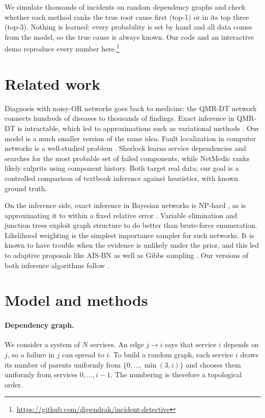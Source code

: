 \documentclass{article}
\begin{document}
We simulate thousands of incidents on random dependency graphs and check
whether each method ranks the true root cause first (top-1) or in its top
three (top-3). Nothing is learned: every probability is set by hand and all
data comes from the model, so the true cause is always known. Our code and an
interactive demo reproduce every number
here.\footnote{\url{https://github.com/dipendrak/incident-detective}}

\section{Related work}

Diagnosis with noisy-OR networks \citep{pearl1988probabilistic} goes back to
medicine: the QMR-DT network \citep{shwe1991qmr} connects hundreds of diseases
to thousands of findings. Exact inference in QMR-DT is intractable, which led
to approximations such as variational methods \citep{jaakkola1999qmr}. Our
model is a much smaller version of the same idea. Fault localization in
computer networks is a well-studied problem \citep{steinder2004survey}. Sherlock
\citep{bahl2007sherlock} learns service dependencies and searches for the most
probable set of failed components, while NetMedic \citep{kandula2009netmedic}
ranks likely culprits using component history. Both target real data; our goal
is a controlled comparison of textbook inference against heuristics, with known
ground truth.

On the inference side, exact inference in Bayesian networks is NP-hard
\citep{cooper1990complexity}, as is approximating it to within a fixed relative
error \citep{dagum1993approximating}. Variable elimination
\citep{zhang1994simple} and junction trees \citep{lauritzen1988local} exploit
graph structure to do better than brute-force enumeration. Likelihood weighting
\citep{fung1990weighing,shachter1990simulation} is the simplest importance
sampler for such networks. It is known to have trouble when the evidence is
unlikely under the prior, and this led to adaptive proposals like AIS-BN
\citep{cheng2000aisbn} as well as Gibbs sampling \citep{pearl1987evidential}.
Our versions of both inference algorithms follow \citet{russell2020aima}.

\section{Model and methods}

\paragraph{Dependency graph.}
We consider a system of $N$ services. An edge $j \to i$ says that service $i$
depends on $j$, so a failure in $j$ can spread to $i$. To build a random graph,
each service $i$ draws its number of parents uniformly from
$\{0,\dots,\min(3,i)\}$ and chooses them uniformly from services
$0,\dots,i-1$. The numbering is therefore a topological order.
\end{document}
